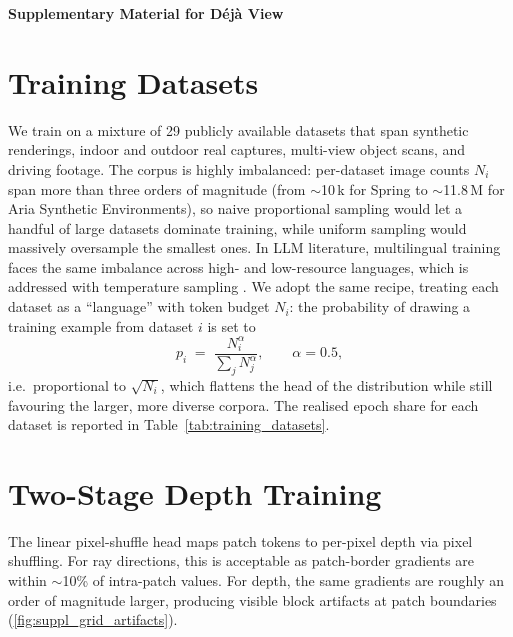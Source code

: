 
\FloatBarrier

\begin{center}
    {\Large \textbf{Supplementary Material for Déjà View}}
\end{center}



\section{Training Datasets}
\label{sec:training_datasets}
We train on a mixture of 29 publicly available datasets that span synthetic
renderings, indoor and outdoor real captures, multi-view object scans, and
driving footage. The corpus is highly imbalanced: per-dataset image counts
$N_i$ span more than three orders of magnitude (from $\sim$10\,k for
Spring to $\sim$11.8\,M for Aria Synthetic Environments), so naive
proportional sampling would let a handful of large datasets dominate
training, while uniform sampling would massively oversample the smallest
ones. In LLM literature, multilingual training faces the same imbalance across high- and
low-resource languages, which is addressed with temperature sampling
\citep{arivazhagan2019massively}. We adopt
the same recipe, treating each dataset as a ``language'' with token
budget $N_i$: the probability of drawing a training
example from dataset $i$ is set to
\[
    p_i \;=\; \frac{N_i^{\alpha}}{\sum_j N_j^{\alpha}},
    \qquad \alpha = 0.5,
\]
i.e.\ proportional to $\sqrt{N_i}$, which flattens the head of the
distribution while still favouring the larger, more diverse corpora.
The realised epoch share for each dataset is reported in
Table~\ref{tab:training_datasets}.

\FloatBarrier
\begin{table}[t]
    \centering
    \footnotesize
    \caption{Per-epoch training-mixture share for the 29 datasets, sorted
    by share. By construction, mix\,\% $= p_i \propto \sqrt{N_i}$ where
    $N_i$ is the total number of training images in dataset $i$.}
    \label{tab:training_datasets}
    
\end{table}


\section{Two-Stage Depth Training}
\label{sec:suppl_two_stage}


The linear pixel-shuffle head maps patch tokens to per-pixel depth via pixel shuffling. For ray directions, this is acceptable as patch-border gradients are within $\sim$10\% of intra-patch values. For depth, the same gradients are roughly an order of magnitude larger, producing visible block artifacts at patch boundaries (\cref{fig:suppl_grid_artifacts}).

